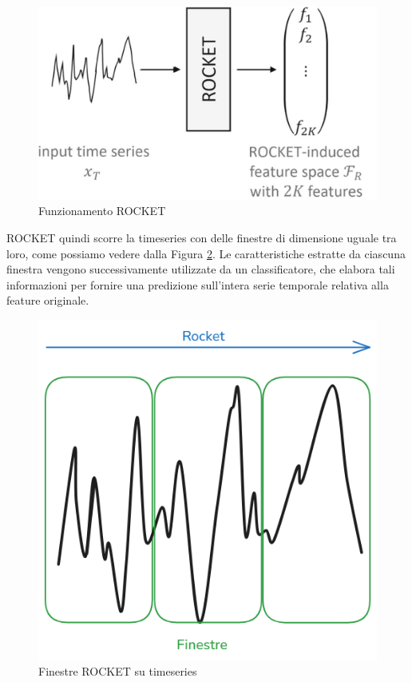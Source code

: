 \begin{figure}[!ht]
    \centering
    \includegraphics[width=0.5\linewidth]{images//Capitolo4/ROCKET_Paper.png}
    \caption{Funzionamento ROCKET}
    \label{fig:rocket_paper}
\end{figure}

ROCKET quindi scorre la timeseries con delle finestre di dimensione uguale tra loro, come possiamo vedere dalla Figura \ref{fig:rocket_finestre}. Le caratteristiche estratte da ciascuna finestra vengono successivamente utilizzate da un classificatore, che elabora tali informazioni per fornire una predizione sull'intera serie temporale relativa alla feature originale.

\begin{figure}[!ht]
    \centering
    \includegraphics[width=0.5\linewidth]{images//Capitolo4/ROCKET_finestre.png}
    \caption{Finestre ROCKET su timeseries}
    \label{fig:rocket_finestre}
\end{figure}
\pagebreak
